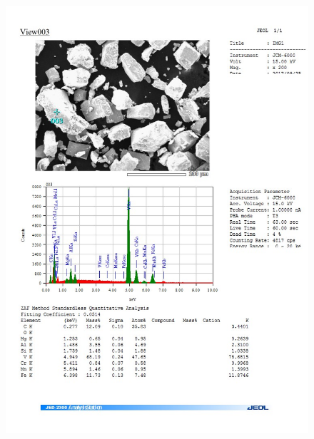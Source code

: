 \documentclass[12pt]{article}
\begin{document}
\begin{figure}[H]
	\includegraphics[width = \linewidth]{./pictures/dot_spec_3.jpg}
\end{figure}
\end{document}
